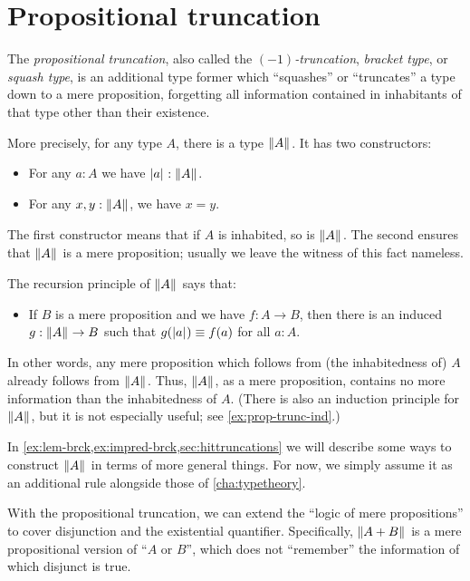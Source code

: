 \section{Propositional truncation}
\label{subsec:prop-trunc}

%
%
%
%
%
The \emph{propositional truncation}, also called the \emph{$(-1)$-truncation}, \emph{bracket type}, or \emph{squash type}, is an additional type former which ``squashes'' or ``truncates'' a type down to a mere proposition, forgetting all information contained in inhabitants of that type other than their existence.

More precisely, for any type $A$, there is a type $\mathopen{}\left\Vert A\right\Vert_{}\mathclose{}$.
It has two constructors:
\begin{itemize}
\item For any $a:A$ we have $\mathopen{}\left|a\right|_{}^{}\mathclose{} : \mathopen{}\left\Vert A\right\Vert_{}\mathclose{}$.
\item For any $x,y:\mathopen{}\left\Vert A\right\Vert_{}\mathclose{}$, we have $x=y$.
\end{itemize}
The first constructor means that if $A$ is inhabited, so is $\mathopen{}\left\Vert A\right\Vert_{}\mathclose{}$.
The second ensures that $\mathopen{}\left\Vert A\right\Vert_{}\mathclose{}$ is a mere proposition; usually we leave the witness of this fact nameless.

%
The recursion principle of $\mathopen{}\left\Vert A\right\Vert_{}\mathclose{}$ says that:
\begin{itemize}
\item If $B$ is a mere proposition and we have $f:A\to B$, then there is an induced $g:\mathopen{}\left\Vert A\right\Vert_{}\mathclose{} \to B$ such that $g(\mathopen{}\left|a\right|_{}^{}\mathclose{}) \equiv f(a)$ for all $a:A$.
\end{itemize}
In other words, any mere proposition which follows from (the inhabitedness of) $A$ already follows from $\mathopen{}\left\Vert A\right\Vert_{}\mathclose{}$.
Thus, $\mathopen{}\left\Vert A\right\Vert_{}\mathclose{}$, as a mere proposition, contains no more information than the inhabitedness of $A$.
(There is also an induction principle for $\mathopen{}\left\Vert A\right\Vert_{}\mathclose{}$, but it is not especially useful; see \cref{ex:prop-trunc-ind}.)

In \cref{ex:lem-brck,ex:impred-brck,sec:hittruncations} we will describe some ways to construct $\mathopen{}\left\Vert A\right\Vert_{}\mathclose{}$ in terms of more general things.
For now, we simply assume it as an additional rule alongside those of \cref{cha:typetheory}.

With the propositional truncation, we can extend the ``logic of mere propositions'' to cover disjunction and the existential quantifier.
Specifically, $\mathopen{}\left\Vert A+B\right\Vert_{}\mathclose{}$ is a mere propositional version of ``$A$ or $B$'', which does not ``remember'' the information of which disjunct is true.

